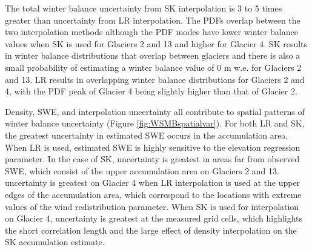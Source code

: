 \documentclass[review,oneside, letterpaper]{igs}
\begin{document}
The total winter balance uncertainty from SK interpolation is 3 to 5 times greater than uncertainty from LR interpolation. The PDFs overlap between the two interpolation methods although the PDF modes have lower winter balance values when SK is used for Glaciers 2 and 13 and higher for Glacier 4. SK results in winter balance distributions that overlap between glaciers and there is also a small probability of estimating a winter balance value of 0 m w.e. for Glaciers 2 and 13. LR results in overlapping winter balance distributions for Glaciers 2 and 4, with the PDF peak of Glacier 4 being slightly higher than that of Glacier 2. 

Density, SWE, and interpolation uncertainty all contribute to spatial patterns of winter balance uncertainty (Figure \ref{fig:WSMBspatialvar}).  For both LR and SK, the greatest uncertainty in estimated SWE occurs in the accumulation area. When LR is used, estimated SWE is highly sensitive to the elevation regression parameter. In the case of SK, uncertainty is greatest in areas far from observed SWE, which consist of the upper accumulation area on Glaciers 2 and 13. uncertainty is greatest on Glacier 4 when LR interpolation is used at the upper edges of the accumulation area, which correspond to the locations with extreme values of the wind redistribution parameter. When SK is used for interpolation on Glacier 4, uncertainty is greatest at the measured grid cells, which highlights the short correlation length and the large effect of density interpolation on the SK accumulation estimate.
\end{document}
